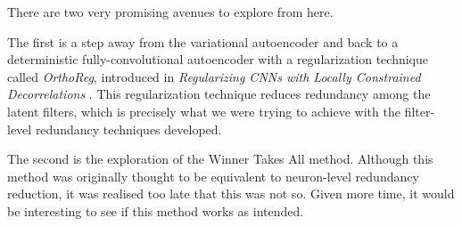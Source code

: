 There are two very promising avenues to explore from here.

The first is a step away from the variational autoencoder and back to a deterministic fully-convolutional autoencoder with a regularization technique called \textit{OrthoReg}, introduced in \textit{Regularizing CNNs with Locally Constrained Decorrelations} \cite{Rodriguez2016}. This regularization technique reduces redundancy among the latent filters, which is precisely what we were trying to achieve with the filter-level redundancy techniques developed.

The second is the exploration of the Winner Takes All method. Although this method was originally thought to be equivalent to neuron-level redundancy reduction, it was realised too late that this was not so. Given more time, it would be interesting to see if this method works as intended.